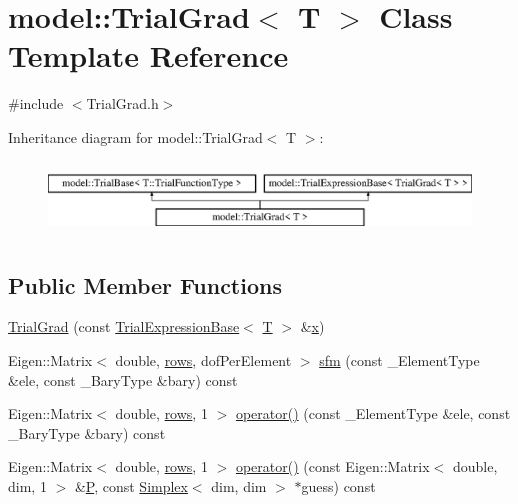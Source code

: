 \hypertarget{classmodel_1_1_trial_grad}{}\section{model\+:\+:Trial\+Grad$<$ T $>$ Class Template Reference}
\label{classmodel_1_1_trial_grad}


{\ttfamily \#include $<$Trial\+Grad.\+h$>$}

Inheritance diagram for model\+:\+:Trial\+Grad$<$ T $>$\+:\begin{figure}[H]
\begin{center}
\leavevmode
\includegraphics[height=1.985816cm]{classmodel_1_1_trial_grad}
\end{center}
\end{figure}
\subsection*{Public Member Functions}
\begin{DoxyCompactItemize}
\item 
\hyperlink{classmodel_1_1_trial_grad_a9e7199f9a71581bd906d59e9be7a41a9}{Trial\+Grad} (const \hyperlink{structmodel_1_1_trial_expression_base}{Trial\+Expression\+Base}$<$ \hyperlink{_spline_node_base__corder1_8h_a82692d3a5502b91460591f1d5504314a}{T} $>$ \&\hyperlink{generate_s_t_lcyl_8m_a9336ebf25087d91c818ee6e9ec29f8c1}{x})
\item 
Eigen\+::\+Matrix$<$ double, \hyperlink{classmodel_1_1_trial_grad_ac56f69d52fed2745e62c5fb1c5be86dd}{rows}, dof\+Per\+Element $>$ \hyperlink{classmodel_1_1_trial_grad_a75e9ca0fb3d24ac9ca56e12f31558104}{sfm} (const \+\_\+\+Element\+Type \&ele, const \+\_\+\+Bary\+Type \&bary) const 
\item 
Eigen\+::\+Matrix$<$ double, \hyperlink{classmodel_1_1_trial_grad_ac56f69d52fed2745e62c5fb1c5be86dd}{rows}, 1 $>$ \hyperlink{classmodel_1_1_trial_grad_ae55d665cc1cfffd222c2abdd04d4b502}{operator()} (const \+\_\+\+Element\+Type \&ele, const \+\_\+\+Bary\+Type \&bary) const 
\item 
Eigen\+::\+Matrix$<$ double, \hyperlink{classmodel_1_1_trial_grad_ac56f69d52fed2745e62c5fb1c5be86dd}{rows}, 1 $>$ \hyperlink{classmodel_1_1_trial_grad_a6b451644e3ce0d3788372b1bcb065186}{operator()} (const Eigen\+::\+Matrix$<$ double, dim, 1 $>$ \&\hyperlink{_f_e_m_2linear__elasticity__3d_2tetgen_2generate_p_o_l_ycube_8m_a50a9afb44201a65ab7ad5feb2150aeb6}{P}, const \hyperlink{classmodel_1_1_simplex}{Simplex}$<$ dim, dim $>$ $\ast$guess) const 
\end{DoxyCompactItemize}
